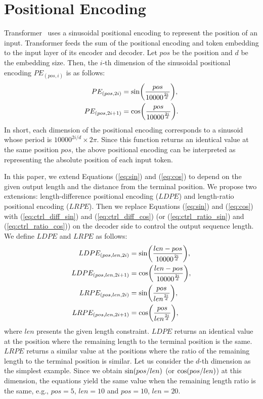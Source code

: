 \documentclass[11pt,a4paper]{article}
\begin{document}
\section{Positional Encoding}
Transformer~\cite{NIPS2017_7181} uses a sinusoidal positional encoding to represent the position of an input.
Transformer feeds the sum of the positional encoding and token embedding to the input layer of its encoder and decoder.
Let $pos$ be the position and $d$ be the embedding size.
Then, the $i$-th dimension of the sinusoidal positional encoding $PE_{(pos, i)}$ is as follows:
\begin{align}
  PE_{(pos, 2i)} &= {\rm sin}\bigg(\frac{pos}{10000^{\frac{2i}{d}}}\bigg), \label{eq:sin}\\
  PE_{(pos, 2i+1)} &= {\rm cos}\bigg(\frac{pos}{10000^{\frac{2i}{d}}}\bigg). \label{eq:cos}
\end{align}
In short, each dimension of the positional encoding corresponds to a sinusoid whose period is $10000^{2i / d} \times 2\pi$.
Since this function returns an identical value at the same position $pos$, the above positional encoding can be interpreted as representing the absolute position of each input token.


In this paper, we extend Equations (\ref{eq:sin}) and (\ref{eq:cos}) to depend on the given output length and the distance from the terminal position.
We propose two extensions: length-difference positional encoding ($LDPE$) and length-ratio positional encoding ($LRPE$).
Then we replace Equations (\ref{eq:sin}) and (\ref{eq:cos}) with (\ref{eq:ctrl_diff_sin}) and (\ref{eq:ctrl_diff_cos}) (or (\ref{eq:ctrl_ratio_sin}) and (\ref{eq:ctrl_ratio_cos})) on the decoder side to control the output sequence length.
We define $LDPE$ and $LRPE$ as follows:
\begin{align}
  LDPE_{(pos, len, 2i)} &= {\rm sin}\bigg(\frac{len - pos}{10000^{\frac{2i}{d}}}\bigg), \label{eq:ctrl_diff_sin}\\
  LDPE_{(pos, len, 2i+1)} &= {\rm cos}\bigg(\frac{len - pos}{10000^{\frac{2i}{d}}}\bigg), \label{eq:ctrl_diff_cos} \\
  LRPE_{(pos, len, 2i)} &= {\rm sin}\bigg(\frac{pos}{len^{\frac{2i}{d}}}\bigg), \label{eq:ctrl_ratio_sin}\\
  LRPE_{(pos, len, 2i+1)} &= {\rm cos}\bigg(\frac{pos}{len^{\frac{2i}{d}}}\bigg), \label{eq:ctrl_ratio_cos}
\end{align}
where $len$ presents the given length constraint.
$LDPE$ returns an identical value at the position where the remaining length to the terminal position is the same.
$LRPE$ returns a similar value at the positions where the ratio of the remaining length to the terminal position is similar.
Let us consider the $d$-th dimension as the simplest example.
Since we obtain ${\rm sin}(pos / len)$ (or ${\rm cos}(pos / len)$) at this dimension, the equations yield the same value when the remaining length ratio is the same, e.g., $pos = 5$, $len = 10$ and $pos = 10$, $len = 20$.
\end{document}
